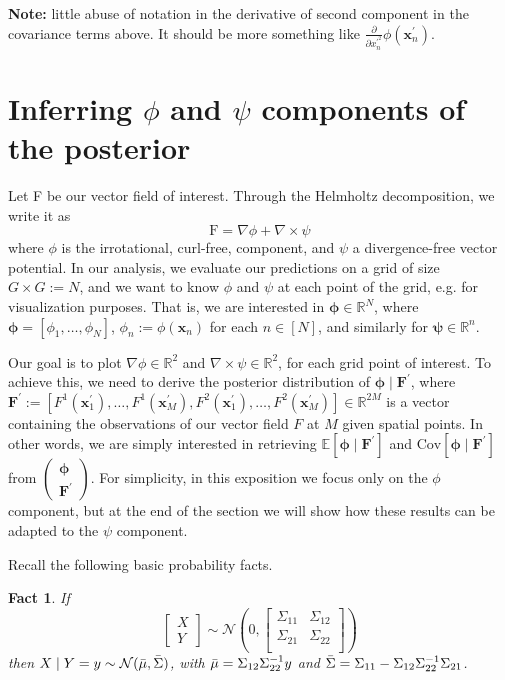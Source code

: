 \documentclass[11pt,a4paper]{article}
\newcommand{\icol}[1]{%
  \left(\begin{smallmatrix}#1\end{smallmatrix}\right)%
}
\newtheorem{fact}{Fact}
\begin{document}

\textbf{Note:} little abuse of notation in the derivative of second component in the covariance terms above. It should be more something like $\frac{\partial}{\partial x_n^{\prime^2}} \phi(\textbf{x}_n^\prime)$.

\section*{Inferring $\phi$ and $\psi$ components of the posterior}

Let F be our vector field of interest. Through the Helmholtz decomposition, we write it as 
$$
\text{F} = \nabla \phi + \nabla \times \psi
$$
where $\phi$ is the irrotational, curl-free, component, and $\psi$ a divergence-free vector potential. In our analysis, we evaluate our predictions on a grid of size $G \times G := N$, and we want to know $\phi$ and $\psi$ at each point of the grid, e.g. for visualization purposes. That is, we are interested in $\bm{\phi} \in \mathbb{R}^N$, where $\bm{\phi} = [\phi_1, \ldots, \phi_N]$, $\phi_n := \phi(\textbf{x}_n)$ for each $n \in [N]$, and similarly for $\bm{\psi} \in \mathbb{R}^n$.

Our goal is to plot $\nabla \phi \in \mathbb{R}^2$ and $\nabla \times \psi \in \mathbb{R}^2$, for each grid point of interest. To achieve this, we need to derive the posterior distribution of $\bm{\phi} \mid \textbf{F}^\prime$, where $\textbf{F}^\prime := [F^1(\textbf{x}^\prime_1), \ldots, F^1(\textbf{x}^\prime_M), F^2(\textbf{x}^\prime_1), \ldots, F^2(\textbf{x}^\prime_M) ] \in \mathbb{R}^{2M}$ is a vector containing the observations of our vector field $F$ at $M$ given spatial points. In other words, we are simply interested in retrieving $\mathbb{E}[\bm{\phi}\mid\textbf{F}^\prime]$ and $\text{Cov}[\bm{\phi}\mid\textbf{F}^\prime]$ from $\icol{\bm{\phi} \\ \textbf{F}^\prime}$.  For simplicity, in this exposition we focus only on the $\phi$ component, but at the end of the section we will show how these results can be adapted to the $\psi$ component. \newline

Recall the following basic probability facts.
\begin{fact}
If 
$$
\begin{bmatrix}
X \\ Y
\end{bmatrix}
\sim \mathcal{N}\left(0,
\begin{bmatrix}
\Sigma_{11} & \Sigma_{12} \\
\Sigma_{21} & \Sigma_{22} \\
\end{bmatrix}
\right)
$$
then $X \mid Y = y \sim \mathcal{N}(\Bar{\mu}, \Bar{\Sigma})$, with $\Bar{\mu} = \Sigma_{12} \Sigma_{22}^{-1}y$ and $\Bar{\Sigma} = \Sigma_{11} - \Sigma_{12} \Sigma_{22}^{-1}\Sigma_{21}$.

\end{fact}
\end{document}
